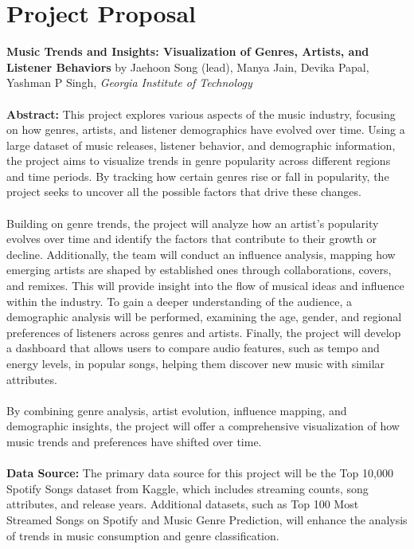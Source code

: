 \documentclass[12pt]{article}
\begin{document}
\section*{Project Proposal}
\textbf{Music Trends and Insights: Visualization of Genres, Artists, and Listener Behaviors}
by Jaehoon Song (lead), Manya Jain, Devika Papal, Yashman P Singh, \textit{Georgia Institute of Technology} \\ \\ 
\textbf{Abstract:} This project explores various aspects of the music industry, focusing on how genres, artists, and listener demographics have evolved over time. Using a large dataset of music releases, listener behavior, and demographic information, the project aims to visualize trends in genre popularity across different regions and time periods. By tracking how certain genres rise or fall in popularity, the project seeks to uncover all the possible factors that drive these changes.\\ \\
Building on genre trends, the project will analyze how an artist's popularity evolves over time and identify the factors that contribute to their growth or decline. Additionally, the team will conduct an influence analysis, mapping how emerging artists are shaped by established ones through collaborations, covers, and remixes. This will provide insight into the flow of musical ideas and influence within the industry. To gain a deeper understanding of the audience, a demographic analysis will be performed, examining the age, gender, and regional preferences of listeners across genres and artists. Finally, the project will develop a dashboard that allows users to compare audio features, such as tempo and energy levels, in popular songs, helping them discover new music with similar attributes. \\ \\
By combining genre analysis, artist evolution, influence mapping, and demographic insights, the project will offer a comprehensive visualization of how music trends and preferences have shifted over time. \\ \\
\textbf{Data Source:} The primary data source for this project will be the Top 10,000 Spotify Songs dataset from Kaggle, which includes streaming counts, song attributes, and release years. Additional datasets, such as Top 100 Most Streamed Songs on Spotify and Music Genre Prediction, will enhance the analysis of trends in music consumption and genre classification.
\end{document}
